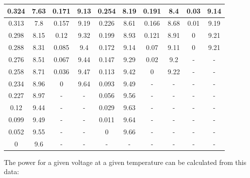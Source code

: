 \documentclass[12pt]{article}
\begin{document}
\begin{center}
\begin{tabular}{|| c c | c c | c c | c c | c c ||}
0.324 & 7.63 & 0.171 & 9.13 & 0.254 & 8.19 & 0.191 & 8.4 & 0.03 & 9.14 \\ \hline 
0.313 & 7.8 & 0.157 & 9.19 & 0.226 & 8.61 & 0.166 & 8.68 & 0.01 & 9.19 \\ \hline 
0.298 & 8.15 & 0.12 & 9.32 & 0.199 & 8.93 & 0.121 & 8.91 & 0 & 9.21 \\ \hline 
0.288 & 8.31 & 0.085 & 9.4 & 0.172 & 9.14 & 0.07 & 9.11 & 0 & 9.21 \\ \hline 
0.276 & 8.51 & 0.067 & 9.44 & 0.147 & 9.29 & 0.02 & 9.2 & - & - \\ \hline 
0.258 & 8.71 & 0.036 & 9.47 & 0.113 & 9.42 & 0 & 9.22 & - & - \\ \hline 
0.234 & 8.96 & 0 & 9.64 & 0.093 & 9.49 & - & - & - & - \\ \hline 
0.227 & 8.97 & - & - & 0.056 & 9.56 & - & - & - & - \\ \hline 
0.12 & 9.44 & - & - & 0.029 & 9.63 & - & - & - & - \\ \hline 
0.099 & 9.49 & - & - & 0.011 & 9.64 & - & - & - & - \\ \hline 
0.052 & 9.55 & - & - & 0 & 9.66 & - & - & - & - \\ \hline 
0 & 9.6 & - & - & - & - & - & - & - & - \\ \hline 
\end{tabular}
\end{center}

The power for a given voltage at a given temperature can be calculated from this data:
\end{document}
